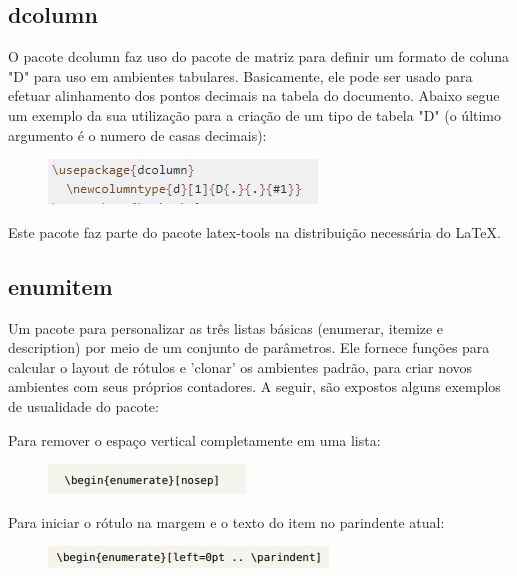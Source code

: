 \documentclass[12pt]{article}
\begin{document}
			
		\subsection{dcolumn}
			O pacote dcolumn faz uso do pacote de matriz para definir um formato de coluna "D" para uso em ambientes tabulares. Basicamente, ele pode ser usado para  efetuar alinhamento dos pontos decimais na tabela do documento. Abaixo segue um exemplo da sua utilização para a criação de um tipo de tabela "D" (o último argumento é o numero de casas decimais):
			
			\begin{figure}[!htb]
				\centering
				\includegraphics[scale=1]{dcolumn1.JPG}
			\end{figure}
			
			Este pacote faz parte do pacote latex-tools na distribuição necessária do \LaTeX.
		
		\subsection{enumitem}
			Um pacote para personalizar as três listas básicas (enumerar, itemize e description) por meio de um conjunto de parâmetros. Ele fornece funções para calcular o layout de rótulos e 'clonar' os ambientes padrão, para criar novos ambientes com seus próprios contadores. A seguir, são expostos alguns exemplos de usualidade do pacote:
			
			Para remover o espaço vertical completamente em uma lista:
			
			\begin{figure}[!htb]
				\centering
				\includegraphics[scale=1]{2.JPG}
			\end{figure}
			
			Para iniciar o rótulo na margem e o texto do item no parindente atual:
			
			\begin{figure}[!htb]
				\centering
				\includegraphics[scale=1]{3.JPG}
			\end{figure}
			
\end{document}
